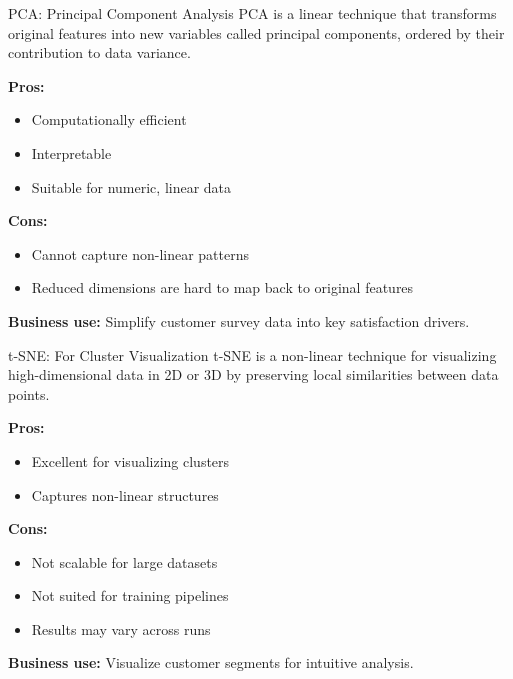 \documentclass[aspectratio=169, table]{beamer}
\begin{document}
\begin{frame}{PCA: Principal Component Analysis}
	PCA is a linear technique that transforms original features into new variables called principal components, ordered by their contribution to data variance.
	
	\textbf{Pros:}
	\begin{itemize}
		\item Computationally efficient
		\item Interpretable
		\item Suitable for numeric, linear data
	\end{itemize}
	
	\textbf{Cons:}
	\begin{itemize}
		\item Cannot capture non-linear patterns
		\item Reduced dimensions are hard to map back to original features
	\end{itemize}
	
	\textbf{Business use:} Simplify customer survey data into key satisfaction drivers.
\end{frame}

\begin{frame}{t-SNE: For Cluster Visualization}
	t-SNE is a non-linear technique for visualizing high-dimensional data in 2D or 3D by preserving local similarities between data points.
	
	\textbf{Pros:}
	\begin{itemize}
		\item Excellent for visualizing clusters
		\item Captures non-linear structures
	\end{itemize}
	
	\textbf{Cons:}
	\begin{itemize}
		\item Not scalable for large datasets
		\item Not suited for training pipelines
		\item Results may vary across runs
	\end{itemize}
	
	\textbf{Business use:} Visualize customer segments for intuitive analysis.
\end{frame}
\end{document}
